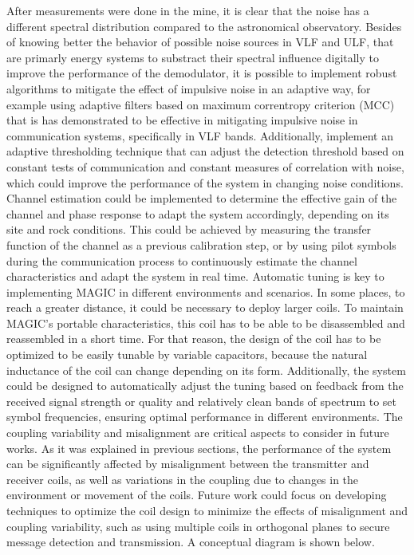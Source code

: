 After measurements were done in the mine, it is clear that the noise has a different spectral distribution compared to the astronomical observatory. Besides of knowing better the behavior of possible noise sources in VLF and ULF, that are primarly energy systems to substract their spectral influence digitally to improve the performance of the demodulator, it is possible to implement robust algorithms to mitigate the effect of impulsive noise in an adaptive way, for example using adaptive filters based on maximum correntropy criterion (MCC) \cite{wang2018adaptive} that is has demonstrated to be effective in mitigating impulsive noise in communication systems, specifically in VLF bands. Additionally, implement an adaptive thresholding technique that can adjust the detection threshold based on constant tests of communication and constant measures of correlation with noise, which could improve the performance of the system in changing noise conditions.
\newp
Channel estimation could be implemented to determine the effective gain of the channel and phase response to adapt the system accordingly, depending on its site and rock conditions. This could be achieved by measuring the transfer function of the channel as a previous calibration step, or by using pilot symbols during the communication process to continuously estimate the channel characteristics and adapt the system in real time.
\newp
Automatic tuning is key to implementing MAGIC in different environments and scenarios. In some places, to reach a greater distance, it could be necessary to deploy larger coils. To maintain MAGIC's portable characteristics, this coil has to be able to be disassembled and reassembled in a short time. For that reason, the design of the coil has to be optimized to be easily tunable by variable capacitors, because the natural inductance of the coil can change depending on its form. Additionally, the system could be designed to automatically adjust the tuning based on feedback from the received signal strength or quality and relatively clean bands of spectrum to set symbol frequencies, ensuring optimal performance in different environments. %
\newp
The coupling variability and misalignment are critical aspects to consider in future works. As it was explained in previous sections, the performance of the system can be significantly affected by misalignment between the transmitter and receiver coils, as well as variations in the coupling due to changes in the environment or movement of the coils. Future work could focus on developing techniques to optimize the coil design to minimize the effects of misalignment and coupling variability, such as using multiple coils in orthogonal planes to secure message detection and transmission. A conceptual diagram is shown below.

